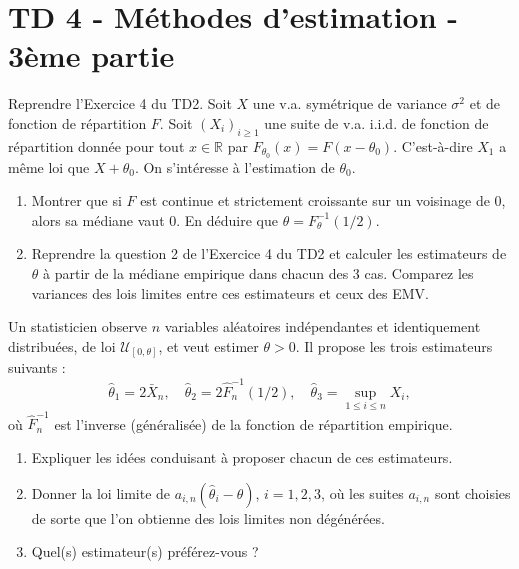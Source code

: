 \chapter*{TD 4 - Méthodes d'estimation - 3ème partie}

\setcounter{exercice}{0}

\begin{mdframed}
\begin{exercice}
Reprendre l’Exercice 4 du TD2. Soit $X$ une v.a. symétrique de variance $\sigma^2$ et de fonction de répartition $F$. Soit $(X_i)_{i \ge 1}$ une suite de v.a. i.i.d. de fonction de répartition donnée pour tout $x \in \mathbb{R}$ par $F_{\theta_0}(x) = F(x - \theta_0)$. C’est-à-dire $X_1$ a même loi que $X + \theta_0$. On s’intéresse à l’estimation de $\theta_0$.

\begin{enumerate}
    \item Montrer que si $F$ est continue et strictement croissante sur un voisinage de 0, alors sa médiane vaut 0. En déduire que $\theta = F_\theta^{-1}(1/2)$.
    \item Reprendre la question 2 de l’Exercice 4 du TD2 et calculer les estimateurs de $\theta$ à partir de la médiane empirique dans chacun des 3 cas. Comparez les variances des lois limites entre ces estimateurs et ceux des EMV.
\end{enumerate}
\end{exercice}
\end{mdframed}

\smallskip

\begin{mdframed}
\begin{exercice}
Un statisticien observe $n$ variables aléatoires indépendantes et identiquement distribuées, de loi $\mathcal{U}_{[0,\theta]}$, et veut estimer $\theta > 0$. Il propose les trois estimateurs suivants :
\begin{equation*}
\hat{\theta}_1 = 2\bar{X}_n, \quad \hat{\theta}_2 = 2\hat{F}_n^{-1}(1/2), \quad \hat{\theta}_3 = \sup_{1 \le i \le n} X_i,
\end{equation*}
où $\hat{F}_n^{-1}$ est l’inverse (généralisée) de la fonction de répartition empirique.

\begin{enumerate}
    \item Expliquer les idées conduisant à proposer chacun de ces estimateurs.
    \item Donner la loi limite de $a_{i,n} (\hat{\theta}_i - \theta)$, $i = 1, 2, 3$, où les suites $a_{i,n}$ sont choisies de sorte que l’on obtienne des lois limites non dégénérées.
    \item Quel(s) estimateur(s) préférez-vous ?
\end{enumerate}
\end{exercice}
\end{mdframed}

